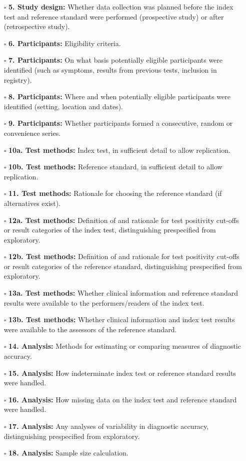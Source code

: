 \documentclass[11pt]{article}
\def\tightlist{}
\begin{document}
\begin{Form}
\begin{itemize}
\tightlist
\item[$\square$]
  \textbf{5. Study design:} Whether data collection was planned before
  the index test and reference standard were performed (prospective
  study) or after (retrospective study).
\item[$\square$]
  \textbf{6. Participants:} Eligibility criteria.
\item[$\square$]
  \textbf{7. Participants:} On what basis potentially eligible
  participants were identified (such as symptoms, results from previous
  tests, inclusion in registry).
\item[$\square$]
  \textbf{8. Participants:} Where and when potentially eligible
  participants were identified (setting, location and dates).
\item[$\square$]
  \textbf{9. Participants:} Whether participants formed a consecutive,
  random or convenience series.
\item[$\square$]
  \textbf{10a. Test methods:} Index test, in sufficient detail to allow
  replication.
\item[$\square$]
  \textbf{10b. Test methods:} Reference standard, in sufficient detail
  to allow replication.
\item[$\square$]
  \textbf{11. Test methods:} Rationale for choosing the reference
  standard (if alternatives exist).
\item[$\square$]
  \textbf{12a. Test methods:} Definition of and rationale for test
  positivity cut-offs or result categories of the index test,
  distinguishing prespecified from exploratory.
\item[$\square$]
  \textbf{12b. Test methods:} Definition of and rationale for test
  positivity cut-offs or result categories of the reference standard,
  distinguishing prespecified from exploratory.
\item[$\square$]
  \textbf{13a. Test methods:} Whether clinical information and reference
  standard results were available to the performers/readers of the index
  test.
\item[$\square$]
  \textbf{13b. Test methods:} Whether clinical information and index
  test results were available to the assessors of the reference
  standard.
\item[$\square$]
  \textbf{14. Analysis:} Methods for estimating or comparing measures of
  diagnostic accuracy.
\item[$\square$]
  \textbf{15. Analysis:} How indeterminate index test or reference
  standard results were handled.
\item[$\square$]
  \textbf{16. Analysis:} How missing data on the index test and
  reference standard were handled.
\item[$\square$]
  \textbf{17. Analysis:} Any analyses of variability in diagnostic
  accuracy, distinguishing prespecified from exploratory.
\item[$\square$]
  \textbf{18. Analysis:} Sample size calculation.
\end{itemize}


\end{Form}
\end{document}
